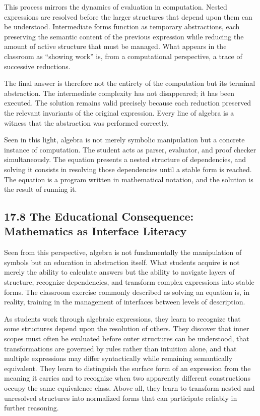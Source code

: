 \documentclass[12pt,letterpaper]{article}
\theoremstyle{remark}
\begin{document}
This process mirrors the dynamics of evaluation in computation. Nested expressions are resolved before the larger structures that depend upon them can be understood. Intermediate forms function as temporary abstractions, each preserving the semantic content of the previous expression while reducing the amount of active structure that must be managed. What appears in the classroom as “showing work” is, from a computational perspective, a trace of successive reductions.

The final answer is therefore not the entirety of the computation but its terminal abstraction. The intermediate complexity has not disappeared; it has been executed. The solution remains valid precisely because each reduction preserved the relevant invariants of the original expression. Every line of algebra is a witness that the abstraction was performed correctly.

Seen in this light, algebra is not merely symbolic manipulation but a concrete instance of computation. The student acts as parser, evaluator, and proof checker simultaneously. The equation presents a nested structure of dependencies, and solving it consists in resolving those dependencies until a stable form is reached. The equation is a program written in mathematical notation, and the solution is the result of running it.

\subsection{17.8 The Educational Consequence: Mathematics as Interface Literacy}

Seen from this perspective, algebra is not fundamentally the manipulation of symbols but an education in abstraction itself. What students acquire is not merely the ability to calculate answers but the ability to navigate layers of structure, recognize dependencies, and transform complex expressions into stable forms. The classroom exercise commonly described as solving an equation is, in reality, training in the management of interfaces between levels of description.

As students work through algebraic expressions, they learn to recognize that some structures depend upon the resolution of others. They discover that inner scopes must often be evaluated before outer structures can be understood, that transformations are governed by rules rather than intuition alone, and that multiple expressions may differ syntactically while remaining semantically equivalent. They learn to distinguish the surface form of an expression from the meaning it carries and to recognize when two apparently different constructions occupy the same equivalence class. Above all, they learn to transform nested and unresolved structures into normalized forms that can participate reliably in further reasoning.
\end{document}
